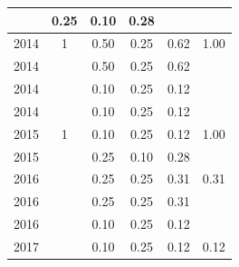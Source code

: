 \begin{table}[H]
\begin{tabular}{| l | c | c | c | c | c |}
          &
          0.25
          &
          0.10
          &
          0.28
          &
          \\
\hline
            2014
          &
          1
          &
          0.50
          &
          0.25
          &
          0.62
          &
            {\color{blue} 1.00}
          \\
            2014
          &
          
          &
          0.50
          &
          0.25
          &
          0.62
          &
          \\
            2014
          &
          
          &
          0.10
          &
          0.25
          &
          0.12
          &
          \\
            2014
          &
          
          &
          0.10
          &
          0.25
          &
          0.12
          &
          \\
\hline
            2015
          &
          1
          &
          0.10
          &
          0.25
          &
          0.12
          &
            {\color{blue} 1.00}
          \\
            2015
          &
          
          &
          0.25
          &
          0.10
          &
          0.28
          &
          \\
\hline
            2016
          &
          
          &
          0.25
          &
          0.25
          &
          0.31
          &
            {\color{red} 0.31}
          \\
            2016
          &
          
          &
          0.25
          &
          0.25
          &
          0.31
          &
          \\
            2016
          &
          
          &
          0.10
          &
          0.25
          &
          0.12
          &
          \\
\hline
            2017
          &
          
          &
          0.10
          &
          0.25
          &
          0.12
          &
            {\color{red} 0.12}
          \\
\hline
\end{tabular}
\end{table}



